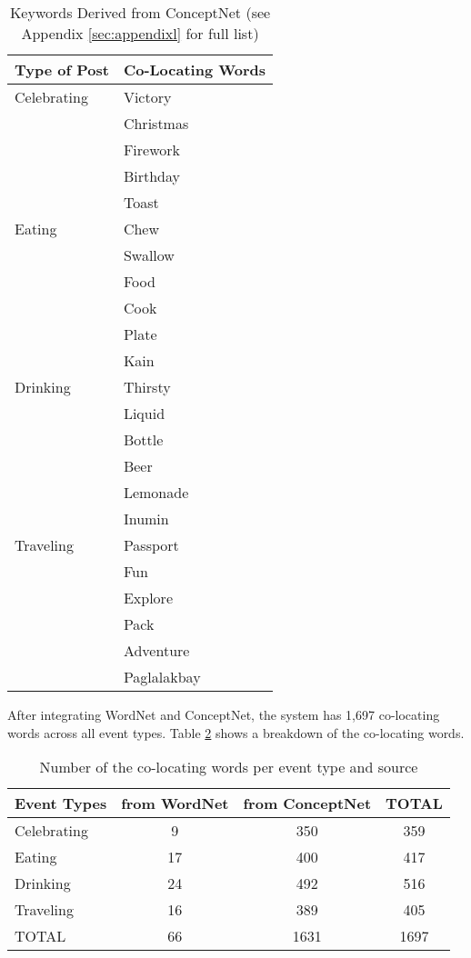 \begin{table}[ph!]   %
	\centering
	\caption{Keywords Derived from ConceptNet (see Appendix \ref{sec:appendixl} for full list)} \vspace{0.25em}
	\begin{tabular}{|p{1.5in}|p{2in}|} \hline
		\centering Type of Post & Co-Locating Words \\ \hline
		Celebrating 
			& Victory \\ 
			& Christmas \\ 
			& Firework \\ 
			& Birthday \\ 
			& Toast \\\hline
		Eating  
			& Chew \\ 
			& Swallow \\ 
			& Food \\ 
			& Cook \\ 
			& Plate \\ 
			& Kain \\\hline

		Drinking 
			& Thirsty \\ 
			& Liquid \\
			& Bottle \\ 
			& Beer \\ 
			& Lemonade \\ 
			& Inumin \\\hline
		Traveling 
			& Passport \\ 
			& Fun \\ 
			& Explore \\ 
			& Pack \\ 
			& Adventure \\ 
			& Paglalakbay  \\\hline
	\end{tabular}
	\label{tab:EventClassificationConceptNet}
\end{table}

After integrating WordNet and ConceptNet, the system has 1,697 co-locating words across all event types. Table \ref{tab:Co-locatingWords} shows a breakdown of the co-locating words.
\begin{table}[ph!]   %
	\centering
	\caption{Number of the co-locating words per event type and source} \vspace{0.25em}
	\begin{tabular}{|p{1in}|c|c|c|} \hline
		\centering Event Types & from WordNet & from ConceptNet & TOTAL \\ \hline
		Celebrating & 9 & 350 & 359 \\ \hline
		Eating & 17 & 400 & 417 \\ \hline
		Drinking & 24 & 492 & 516 \\ \hline
		Traveling & 16 & 389 & 405 \\ \hline
		TOTAL & 66 & 1631 & 1697 \\ \hline
	\end{tabular}
	\label{tab:Co-locatingWords}
\end{table}

